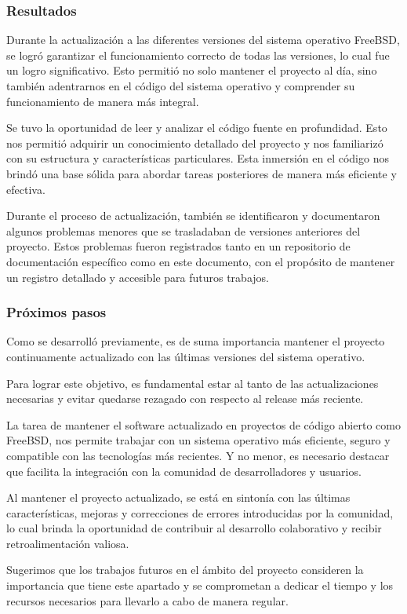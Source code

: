 \subsubsection{Resultados}

Durante la actualización a las diferentes versiones del sistema operativo FreeBSD, se logró garantizar el funcionamiento correcto de todas las versiones, lo cual fue un logro significativo. Esto permitió no solo mantener el proyecto al día, sino también adentrarnos en el código del sistema operativo y comprender su funcionamiento de manera más integral.\par

Se tuvo la oportunidad de leer y analizar el código fuente en profundidad. Esto nos permitió adquirir un conocimiento detallado del proyecto y nos familiarizó con su estructura y características particulares. Esta inmersión en el código nos brindó una base sólida para abordar tareas posteriores de manera más eficiente y efectiva.\par

Durante el proceso de actualización, también se identificaron y documentaron algunos problemas menores que se trasladaban de versiones anteriores del proyecto. Estos problemas fueron registrados tanto en un repositorio de documentación específico como en este documento, con el propósito de mantener un registro detallado y accesible para futuros trabajos.\par


\subsubsection{Próximos pasos}

Como se desarrolló previamente, es de suma importancia mantener el proyecto continuamente actualizado con las últimas versiones del sistema operativo.\par

Para lograr este objetivo, es fundamental estar al tanto de las actualizaciones necesarias y evitar quedarse rezagado con respecto al release más reciente.\par

La tarea de mantener el software actualizado en proyectos de código abierto como FreeBSD, nos permite trabajar con un sistema operativo más eficiente, seguro y compatible con las tecnologías más recientes. Y no menor, es necesario destacar que facilita la integración con la comunidad de desarrolladores y usuarios.\par

Al mantener el proyecto actualizado, se está en sintonía con las últimas características, mejoras y correcciones de errores introducidas por la comunidad, lo cual brinda la oportunidad de contribuir al desarrollo colaborativo y recibir retroalimentación valiosa.\par

Sugerimos que los trabajos futuros en el ámbito del proyecto consideren la importancia que tiene este apartado y se comprometan a dedicar el tiempo y los recursos necesarios para llevarlo a cabo de manera regular.\par
